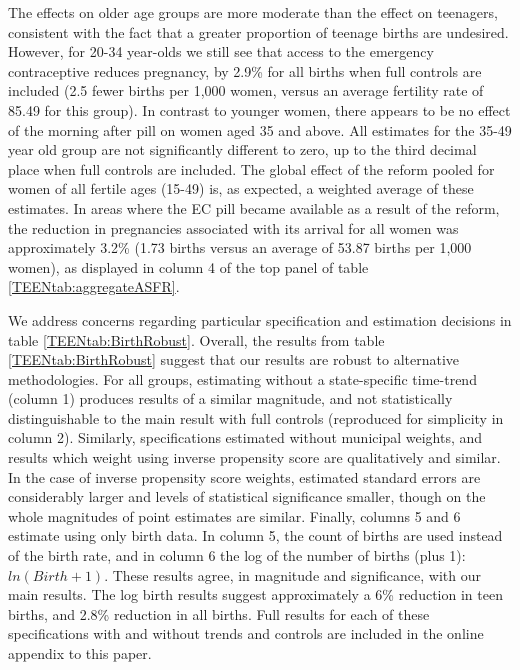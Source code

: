 The effects on older age groups are more moderate than the effect on teenagers,
consistent with the fact that a greater proportion of teenage births are
undesired.  However, for 20-34 year-olds we still see that access to the 
emergency contraceptive reduces pregnancy, by 2.9\% for all births when full 
controls are included (2.5 fewer births per 1,000 women, versus an average
fertility rate of 85.49 for this group).  In contrast to younger women, there 
appears to be no effect of the morning after pill on women aged 35 and above.  
All estimates for the 35-49 year old group are not significantly different to 
zero, up to the third decimal place when full controls are included.  The global 
effect of the reform pooled for women of all fertile ages (15-49) is, as 
expected, a weighted average of these estimates.  In areas where the EC pill
became available as a result of the reform, the reduction in pregnancies 
associated with its arrival for all women was approximately 3.2\% (1.73 births
versus an average of 53.87 births per 1,000 women), as displayed in column 4 of
the top panel of table \ref{TEENtab:aggregateASFR}.

We address concerns regarding particular specification and estimation decisions
in table \ref{TEENtab:BirthRobust}.  Overall, the results from table 
\ref{TEENtab:BirthRobust} suggest that our results are robust to alternative
methodologies.  For all groups, estimating without a state-specific time-trend
(column 1) produces results of a similar magnitude, and not statistically
distinguishable to the main result with full controls (reproduced for simplicity
in column 2).  Similarly, specifications estimated without municipal weights,
and results which weight using inverse propensity score are qualitatively and
similar.  In the case of inverse propensity score weights, estimated standard
errors are considerably larger and levels of statistical significance smaller,
though on the whole magnitudes of point estimates are similar.  Finally, columns
5 and 6 estimate using only birth data.  In column 5, the count of births are
used instead of the birth rate, and in column 6 the log of the number of births
(plus 1): $ln(Birth+1)$.  These results agree, in magnitude and significance,
with our main results.  The log birth results suggest approximately a 6\%
reduction in teen births, and 2.8\% reduction in all births.  Full results for
each of these specifications with and without trends and controls are included
in the online appendix to this paper.


